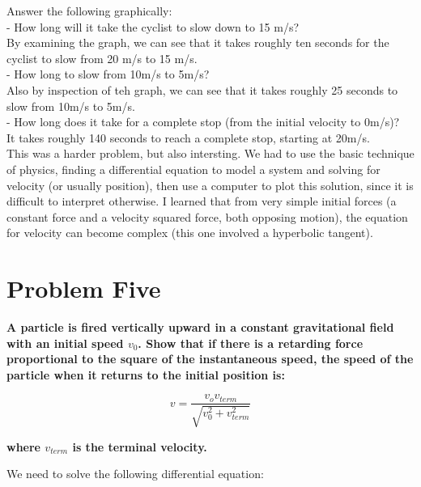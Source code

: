 \documentclass[10pt]{article} %
\begin{document}
Answer the following graphically:\\
- How long will it take the cyclist to slow down to 15 m/s?\\

By examining the graph, we can see that it takes roughly ten seconds for the cyclist to slow from 20 m/s to 15 m/s.\\

- How long to slow from 10m/s to 5m/s?\\

Also by inspection of teh graph, we can see that it takes roughly 25 seconds to slow from 10m/s to 5m/s.\\

- How long does it take for a complete stop (from the initial velocity to 0m/s)?\\
It takes roughly 140 seconds to reach a complete stop, starting at 20m/s.\\

This was a harder problem, but also intersting. We had to use the basic technique of physics, finding a differential equation to model a system and solving for velocity (or usually position), then use a computer to plot this solution, since it is difficult to interpret otherwise. I learned that from very simple initial forces (a constant force and a velocity squared force, both opposing motion), the equation for velocity can become complex (this one involved a hyperbolic tangent).

\section{Problem Five}

\textbf{A particle is fired vertically upward in a constant gravitational field with an initial speed $v_0$.  Show  that  if  there  is  a  retarding  force  proportional  to  the  square  of  the instantaneous speed, the speed of the particle when it returns to the initial position is:}

$$ v = \frac{v_ov_{term}}{\sqrt{v_0^2+v^2_{term}}}  $$

\textbf{where $v_{term}$ is the terminal velocity.}

We need to solve the following differential equation:\\
\end{document}
